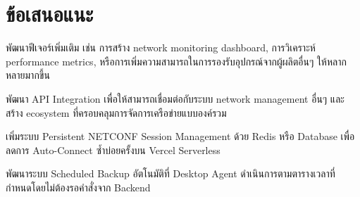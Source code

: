 \section{ข้อเสนอแนะ}
\begin{mycustomenum}[label=5.4.\arabic*] 
    \item พัฒนาฟีเจอร์เพิ่มเติม เช่น การสร้าง network monitoring dashboard, การวิเคราะห์ performance metrics, หรือการเพิ่มความสามารถในการรองรับอุปกรณ์จากผู้ผลิตอื่นๆ ให้หลากหลายมากขึ้น
    \item พัฒนา API Integration เพื่อให้สามารถเชื่อมต่อกับระบบ network management อื่นๆ และสร้าง ecosystem ที่ครอบคลุมการจัดการเครือข่ายแบบองค์รวม
    \item เพิ่มระบบ Persistent NETCONF Session Management ด้วย Redis หรือ Database เพื่อลดการ Auto-Connect ซ้ำบ่อยครั้งบน Vercel Serverless
    \item พัฒนาระบบ Scheduled Backup อัตโนมัติที่ Desktop Agent ดำเนินการตามตารางเวลาที่กำหนดโดยไม่ต้องรอคำสั่งจาก Backend
\end{mycustomenum}
